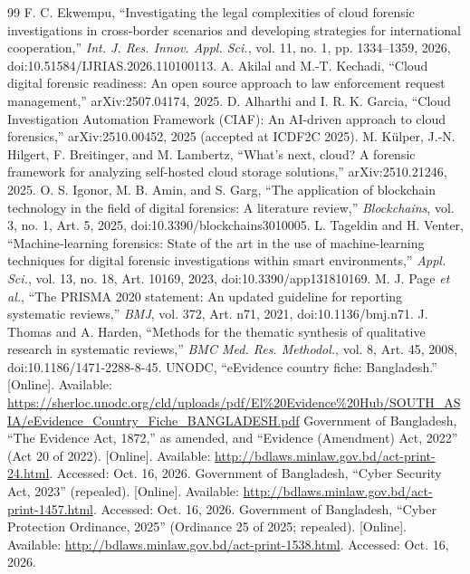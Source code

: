 \documentclass[conference]{IEEEtran}
\begin{document}
\begin{thebibliography}{99}
 F. C. Ekwempu, ``Investigating the legal complexities of cloud forensic investigations in cross-border scenarios and developing strategies for international cooperation,'' \textit{Int. J. Res. Innov. Appl. Sci.}, vol. 11, no. 1, pp. 1334--1359, 2026, doi:10.51584/IJRIAS.2026.110100113.
 A. Akilal and M.-T. Kechadi, ``Cloud digital forensic readiness: An open source approach to law enforcement request management,'' arXiv:2507.04174, 2025.
 D. Alharthi and I. R. K. Garcia, ``Cloud Investigation Automation Framework (CIAF): An AI-driven approach to cloud forensics,'' arXiv:2510.00452, 2025 (accepted at ICDF2C 2025).
 M. K\"ulper, J.-N. Hilgert, F. Breitinger, and M. Lambertz, ``What's next, cloud? A forensic framework for analyzing self-hosted cloud storage solutions,'' arXiv:2510.21246, 2025.
 O. S. Igonor, M. B. Amin, and S. Garg, ``The application of blockchain technology in the field of digital forensics: A literature review,'' \textit{Blockchains}, vol. 3, no. 1, Art. 5, 2025, doi:10.3390/blockchains3010005.
 L. Tageldin and H. Venter, ``Machine-learning forensics: State of the art in the use of machine-learning techniques for digital forensic investigations within smart environments,'' \textit{Appl. Sci.}, vol. 13, no. 18, Art. 10169, 2023, doi:10.3390/app131810169.
 M. J. Page \textit{et al.}, ``The PRISMA 2020 statement: An updated guideline for reporting systematic reviews,'' \textit{BMJ}, vol. 372, Art. n71, 2021, doi:10.1136/bmj.n71.
 J. Thomas and A. Harden, ``Methods for the thematic synthesis of qualitative research in systematic reviews,'' \textit{BMC Med. Res. Methodol.}, vol. 8, Art. 45, 2008, doi:10.1186/1471-2288-8-45.
 UNODC, ``eEvidence country fiche: Bangladesh.'' [Online]. Available: \url{https://sherloc.unodc.org/cld/uploads/pdf/El%20Evidence%20Hub/SOUTH_ASIA/eEvidence_Country_Fiche_BANGLADESH.pdf}
 Government of Bangladesh, ``The Evidence Act, 1872,'' as amended, and ``Evidence (Amendment) Act, 2022'' (Act 20 of 2022). [Online]. Available: \url{http://bdlaws.minlaw.gov.bd/act-print-24.html}. Accessed: Oct. 16, 2026.
 Government of Bangladesh, ``Cyber Security Act, 2023'' (repealed). [Online]. Available: \url{http://bdlaws.minlaw.gov.bd/act-print-1457.html}. Accessed: Oct. 16, 2026.
 Government of Bangladesh, ``Cyber Protection Ordinance, 2025'' (Ordinance 25 of 2025; repealed). [Online]. Available: \url{http://bdlaws.minlaw.gov.bd/act-print-1538.html}. Accessed: Oct. 16, 2026.

\end{thebibliography}
\end{document}
